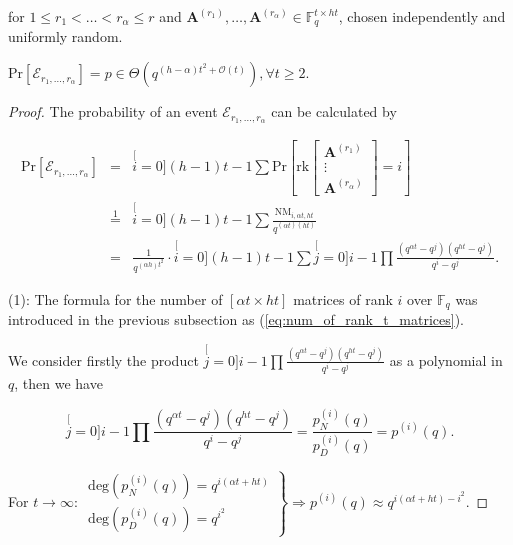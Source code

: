 for $1\leq r_{1}<\ldots<r_{\alpha}\leq r$ and $\boldsymbol{A}^{\left(r_{1}\right)},\ldots,\boldsymbol{A}^{\left(r_{\alpha}\right)}\in\ensuremath{\mathbb{F}}_{q}^{t\times ht}$,
chosen independently and uniformly random.
\begin{lem}
\label{lem:p_e1l1}$\mathrm{Pr}\left[\mathcal{E}_{r_{1},\ldots,r_{\alpha}}\right]=p\in\Theta\left(q^{\left(h-\alpha\right)t^{2}+\mathcal{O}(t)}\right),\forall t\geq2.$
\end{lem}
\begin{proof}
The probability of an event $\mathcal{E}_{r_{1},\ldots,r_{\alpha}}$
can be calculated by 

\begin{eqnarray}
\mathrm{Pr}\left[\mathcal{E}_{r_{1},\ldots,r_{\alpha}}\right] & = & \stackrel[i=0]{(h-1)t-1}{\mathop{\sum}}\mathrm{Pr}\left[\mathrm{rk}\left[\begin{array}{c}
\boldsymbol{A}^{\left(r_{1}\right)}\\
\vdots\\
\boldsymbol{A}^{\left(r_{\alpha}\right)}
\end{array}\right]=i\right]\nonumber \\
 & \overset{1}{=} & \stackrel[i=0]{(h-1)t-1}{\mathop{\sum}}\frac{\mathrm{NM}_{i,\alpha t,ht}}{q^{\left(\alpha t\right)\left(ht\right)}}\nonumber \\
 & = & \frac{1}{q^{\left(\alpha h\right)t^{2}}}\cdot\stackrel[i=0]{(h-1)t-1}{\mathop{\sum}}\stackrel[j=0]{i-1}{\mathop{\prod}}\frac{\left(q^{\alpha t}-q^{j}\right)\left(q^{ht}-q^{j}\right)}{q^{i}-q^{j}}.\label{eq:general_nw_calc_p}
\end{eqnarray}

(1): The formula for the number of $\left[\alpha t\times ht\right]$
matrices of rank $i$ over $\ensuremath{\mathbb{F}}_{q}$ was introduced
in the previous subsection as (\ref{eq:num_of_rank_t_matrices}).

We consider firstly the product $\stackrel[j=0]{i-1}{\mathop{\prod}}\frac{\left(q^{\alpha t}-q^{j}\right)\left(q^{ht}-q^{j}\right)}{q^{i}-q^{j}}$
as a polynomial in $q$, then we have

\[
\stackrel[j=0]{i-1}{\mathop{\prod}}\frac{\left(q^{\alpha t}-q^{j}\right)\left(q^{ht}-q^{j}\right)}{q^{i}-q^{j}}=\frac{p_{N}^{(i)}(q)}{p_{D}^{(i)}(q)}=p^{(i)}(q).
\]

For $t\rightarrow\infty$: $\left.\begin{array}{c}
\mathrm{deg}\left(p_{N}^{(i)}(q)\right)=q^{i(\alpha t+ht)}\\
\mathrm{deg}\left(p_{D}^{(i)}(q)\right)=q^{i^{2}}
\end{array}\right\} \Rightarrow p^{(i)}(q)\approx q^{i(\alpha t+ht)-i^{2}}.$


\end{proof}
